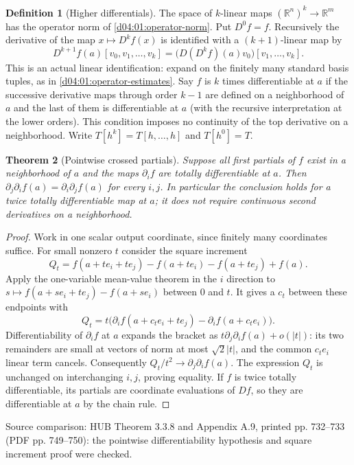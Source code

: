 \documentclass[11pt,oneside,openany]{book}
\newtheorem{theorem}{Theorem}[chapter]
\theoremstyle{definition}
\newtheorem{definition}[theorem]{Definition}
\theoremstyle{remark}
\newcommand{\R}{\mathbb R}
\newcommand{\abs}[1]{\lvert#1\rvert}
\newcommand{\source}[1]{\par\begingroup\small\sffamily\color{black!65}Source comparison: #1\par\endgroup}
\begin{document}
\begin{definition}[Higher differentials]\label{d04:03:higher-derivative}
The space of $k$-linear maps $(\R^n)^k\to\R^m$ has the operator norm of
\cref{d04:01:operator-norm}. Put $D^0f=f$. Recursively the derivative of
the map $x\mapsto D^kf(x)$ is identified with a $(k+1)$-linear map by
\[
 D^{k+1}f(a)[v_0,v_1,\ldots,v_k]
   =\big(D(D^kf)(a)v_0\big)[v_1,\ldots,v_k].
\]
This is an actual linear identification: expand on the finitely many standard
basis tuples, as in \cref{d04:01:operator-estimates}. Say $f$ is $k$ times
differentiable at $a$ if the successive derivative maps through order $k-1$
are defined on a neighborhood of $a$ and the last of them is differentiable
at $a$ (with the recursive interpretation at the lower orders).
This condition imposes no continuity of the top derivative on a neighborhood.
Write $T[h^k]=T[h,\ldots,h]$ and $T[h^0]=T$.
\end{definition}

\begin{theorem}[Pointwise crossed partials]\label{d04:03:crossed-partials}
Suppose all first partials of $f$ exist in a neighborhood of $a$ and the
maps $\partial_if$ are totally differentiable at $a$. Then
$\partial_j\partial_if(a)=\partial_i\partial_jf(a)$ for every $i,j$.
In particular the conclusion holds for a twice totally differentiable map
at $a$; it does not require continuous second derivatives on a neighborhood.
\end{theorem}
\begin{proof}
Work in one scalar output coordinate, since finitely many coordinates suffice.
For small nonzero $t$ consider the square increment
\[
 Q_t=f(a+te_i+te_j)-f(a+te_i)-f(a+te_j)+f(a).
\]
Apply the one-variable mean-value theorem in the $i$ direction to
$s\mapsto f(a+se_i+te_j)-f(a+se_i)$ between $0$ and $t$.
It gives a $c_t$ between these endpoints with
\[
 Q_t=t\big(\partial_if(a+c_te_i+te_j)-\partial_if(a+c_te_i)\big).
\]
Differentiability of $\partial_if$ at $a$ expands the bracket as
$t\partial_j\partial_if(a)+o(\abs{t})$: its two remainders are small
at vectors of norm at most $\sqrt2\abs{t}$, and the common $c_te_i$
linear term cancels. Consequently $Q_t/t^2\to\partial_j\partial_if(a)$.
The expression $Q_t$ is unchanged on interchanging $i,j$, proving equality.
If $f$ is twice totally differentiable, its partials are coordinate
evaluations of $Df$, so they are differentiable at $a$ by the chain rule.
\end{proof}
\source{HUB Theorem 3.3.8 and Appendix A.9, printed pp. 732--733
(PDF pp. 749--750): the pointwise differentiability hypothesis and square
increment proof were checked.}
\end{document}
